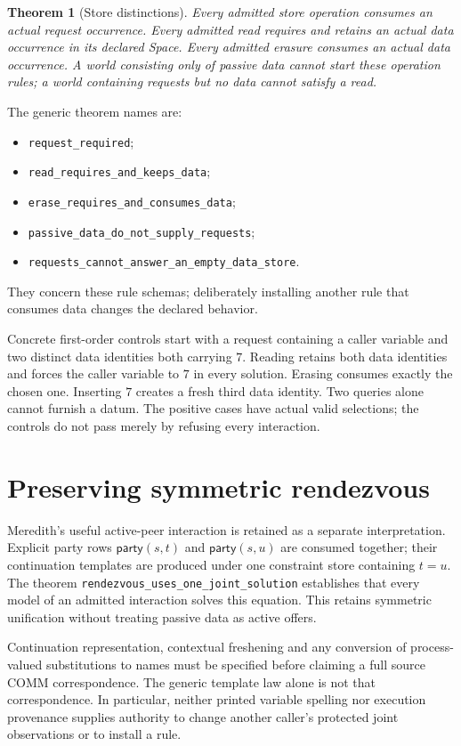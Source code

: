\documentclass[11pt]{article}
\newtheorem{theorem}{Theorem}
\newcommand{\peer}{\mathsf{party}}
\newcommand{\code}[1]{\texttt{\small #1}}
\begin{document}
\begin{theorem}[Store distinctions]
Every admitted store operation consumes an actual request occurrence.
Every admitted read requires and retains an actual data occurrence in its
declared Space. Every admitted erasure consumes an actual data occurrence.
A world consisting only of passive data cannot start these operation rules;
a world containing requests but no data cannot satisfy a read.
\end{theorem}
The generic theorem names are:
\begin{itemize}
\item \code{request\_required};
\item \code{read\_requires\_and\_keeps\_data};
\item \code{erase\_requires\_and\_consumes\_data};
\item \code{passive\_data\_do\_not\_supply\_requests};
\item \code{requests\_cannot\_answer\_an\_empty\_data\_store}.
\end{itemize}
They concern these rule schemas; deliberately installing another rule that
consumes data changes the declared behavior.

Concrete first-order controls start with a request containing a caller
variable and two distinct data identities both carrying $7$. Reading
retains both data identities and forces the caller variable to $7$ in every
solution. Erasing consumes exactly the chosen one. Inserting $7$ creates
a fresh third data identity. Two queries alone cannot furnish a datum.
The positive cases have actual valid selections; the controls do not pass
merely by refusing every interaction.

\section{Preserving symmetric rendezvous}

Meredith's useful active-peer interaction is retained as a separate
interpretation. Explicit party rows $\peer(s,t)$ and $\peer(s,u)$ are
consumed together; their continuation templates are produced under one
constraint store containing $t=u$. The theorem
\code{rendezvous\_uses\_one\_joint\_solution} establishes that every model
of an admitted interaction solves this equation. This retains symmetric
unification without treating passive data as active offers.

Continuation representation, contextual freshening and any conversion of
process-valued substitutions to names must be specified before claiming a
full source COMM correspondence. The generic template law alone is not
that correspondence. In particular, neither printed variable spelling nor
execution provenance supplies authority to change another caller's protected
joint observations or to install a rule.
\end{document}
